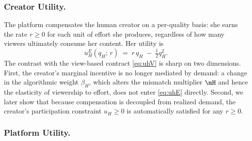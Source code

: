 \subsubsection*{Creator Utility.}

The platform compensates the human creator on a per-quality basis: she earns the rate $r \geq 0$
for each unit of effort she produces, regardless of how many viewers
ultimately consume her content. Her utility is
\begin{equation}\label{eq:uhE}
u_H^{E}(q_H;\,r)
\;=\; r\,q_H \;-\; \tfrac{1}{2}q_H^{2}.
\end{equation}
The contrast with the view-based contract \eqref{eq:uhV} is sharp on
two dimensions. First, the creator's marginal incentive is no longer
mediated by demand: a change in the algorithmic weight $\beta_H$, which
alters the mismatch multiplier $\mH$ and hence the elasticity of
viewership to effort, does not enter \eqref{eq:uhE} directly. Second, we later show that because
compensation is decoupled from realized demand, the creator's
participation constraint $u_H \geq 0$ is automatically satisfied for any
$r \geq 0$.

\subsubsection*{Platform Utility.}

